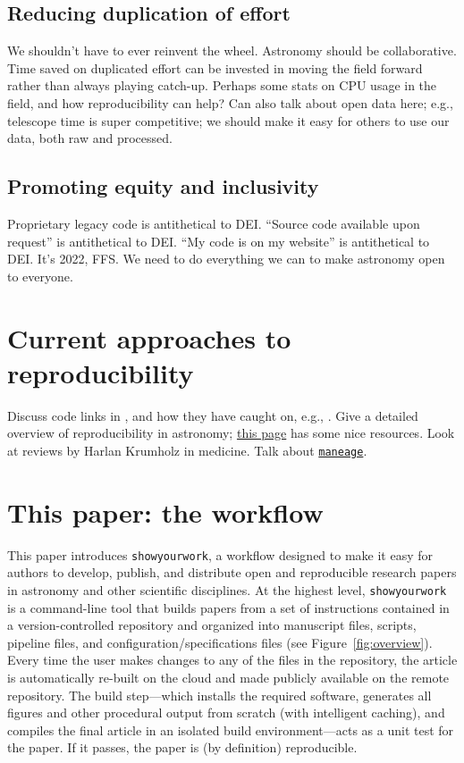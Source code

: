 \documentclass[modern]{aastex631}
\newcommand\xxx[1]{{\color{red}#1}}
\newcommand\syw{\texttt{showyourwork}\xspace}
\begin{document}
\subsection{Reducing duplication of effort}
\label{sec:args:duplication}
\xxx{We shouldn't have to ever reinvent the wheel. Astronomy should be collaborative. Time saved on duplicated effort can be invested in moving the field forward rather than always playing catch-up.}
%
\xxx{Perhaps some stats on CPU usage in the field, and how reproducibility can help?}
%
\xxx{Can also talk about open data here; e.g., telescope time is super competitive; we should make it easy for others to use our data, both raw and processed.}

\subsection{Promoting equity and inclusivity}
\label{sec:args:dei}
\xxx{Proprietary legacy code is antithetical to DEI. ``Source code available upon request'' is antithetical to DEI. ``My code is on my website'' is antithetical to DEI. It's 2022, FFS. We need to do everything we can to make astronomy open to everyone.}


\section{Current approaches to reproducibility}
\label{sec:intro:curr}
\xxx{Discuss code links in \citet{Luger2019,Luger2021a,Luger2021b}, and how they have caught on, e.g., \citet{Paillas2022}.} 
%
\xxx{Give a detailed overview of reproducibility in astronomy; \href{https://maneage.org/pdf/slides-intro.pdf}{this page} has some nice resources. Look at reviews by Harlan Krumholz in medicine. Talk about \texttt{\href{https://maneage.org}{maneage}}.}
%

\section{This paper: the \showyourwork workflow}
\label{sec:intro:syw}
This paper introduces \syw, a workflow designed to make it easy for authors to develop, publish, and distribute open and reproducible research papers in astronomy and other scientific disciplines. 
At the highest level, \syw is a command-line tool that builds papers from a set of instructions contained in a version-controlled repository and organized into manuscript files, scripts, pipeline files, and configuration/specifications files (see Figure~\ref{fig:overview}).
Every time the user makes changes to any of the files in the repository, the article is automatically re-built on the cloud and made publicly available on the remote repository.
The build step---which installs the required software, generates all figures and other procedural output from scratch (with intelligent caching), and compiles the final article in an isolated build environment---acts as a unit test for the paper. 
If it passes, the paper is (by definition) reproducible.
\end{document}

